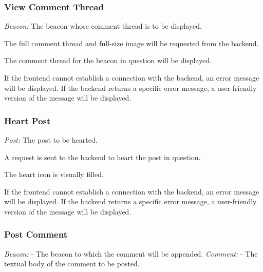         \subsubsection{View Comment Thread}
                \textit{Beacon:} The beacon whose comment thread is to be displayed.

                The full comment thread and full-size image will be requested from
                the backend.

                The comment thread for the beacon in question will be displayed.

                If the frontend cannot establish a connection with the backend,
                an error message will be displayed. \newline
                If the backend returns a specific error message, a user-friendly
                version of the message will be displayed.

        \subsubsection{Heart Post}
                \textit{Post:} The post to be hearted.

                A request is sent to the backend to heart the post in question.

                The heart icon is visually filled.

                If the frontend cannot establish a connection with the backend,
                an error message will be displayed. \newline
                If the backend returns a specific error message, a user-friendly
                version of the message will be displayed.

        \subsubsection{Post Comment}
                \textit{Beacon:} - The beacon to which the comment will be appended.
                                \newline
                \textit{Comment:} - The textual body of the comment to be posted.

